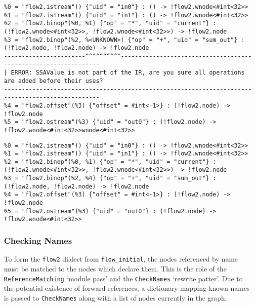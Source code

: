 \makeatletter
{}
\def\dontdofcolorbox{\renewcommand\fcolorbox[4][]{##4}}
\makeatother
\begin{listing}[H]
  \begin{verbatim}
%0 = "flow2.istream"() {"uid" = "in0"} : () -> !flow2.wnode<#int<32>>
%1 = "flow2.istream"() {"uid" = "in1"} : () -> !flow2.wnode<#int<32>>
%2 = "flow2.binop"(%0, %1) {"op" = "*", "uid" = "current"} : (!flow2.wnode<#int<32>>, !flow2.wnode<#int<32>>) -> !flow2.node
%3 = "flow2.binop"(%2, %<UNKNOWN>) {"op" = "+", "uid" = "sum_out"} : (!flow2.node, !flow2.node) -> !flow2.node
-----------------------^^^^^^^^^^----------------------------------------------------------------
| ERROR: SSAValue is not part of the IR, are you sure all operations are added before their uses?
-------------------------------------------------------------------------------------------------
%4 = "flow2.offset"(%3) {"offset" = #int<-1>} : (!flow2.node) -> !flow2.node
%5 = "flow2.ostream"(%3) {"uid" = "out0"} : (!flow2.node) -> !flow2.wnode<#int<32>>wnode<#int<32>>
  \end{verbatim}
  \cprotect\caption{An implementation of an inner product in the \lstinline|flow_2| dialect}\label{dialect.flow_2}
\end{listing}

\makeatletter
\AtBeginEnvironment{minted}{\dontdofcolorbox}
\def\dontdofcolorbox{\renewcommand\fcolorbox[4][]{##4}}
\makeatother
\begin{listing}[H]
  \begin{verbatim}
%0 = "flow2.istream"() {"uid" = "in0"} : () -> !flow2.wnode<#int<32>>
%1 = "flow2.istream"() {"uid" = "in1"} : () -> !flow2.wnode<#int<32>>
%2 = "flow2.binop"(%0, %1) {"op" = "*", "uid" = "current"} : (!flow2.wnode<#int<32>>, !flow2.wnode<#int<32>>) -> !flow2.node
%3 = "flow2.binop"(%2, %4) {"op" = "+", "uid" = "sum_out"} : (!flow2.node, !flow2.node) -> !flow2.node
%4 = "flow2.offset"(%3) {"offset" = #int<-1>} : (!flow2.node) -> !flow2.node
%5 = "flow2.ostream"(%3) {"uid" = "out0"} : (!flow2.node) -> !flow2.wnode<#int<32>>
  \end{verbatim}
  \cprotect\caption{An implementation of an inner product in the \lstinline|flow_2| dialect, with errors fixed.}\label{dialect.flow_2.fixed}
\end{listing}

\subsubsection{Checking Names}\label{dialect.namecheck}
To form the \lstinline|flow2| dialect from \lstinline|flow_initial|, the nodes referenced by name must be matched to the nodes which declare them. This is the role of the \lstinline|ReferenceMatching| `module pass' and the \lstinline|CheckNames| `rewrite patter'. Due to the potential existence of forward references, a dictionary mapping known names is passed to \lstinline|CheckNames| along with a list of nodes currently in the graph.

